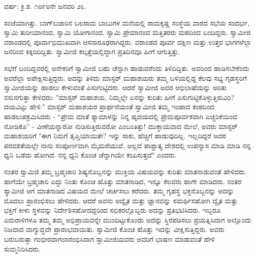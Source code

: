 \begin{center}
ವರ್ಷ: ಕ್ರಿ.ಶ. ೧೮೯೮ನೇ ಜನವರಿ ೨೩.
\end{center}

ಸಂಜೆಯಾಗಿತ್ತು. ಬಾಗ್‌ಬಜಾರಿನ ಬಲರಾಮ ಬಾಬುಗಳ ಮನೆಯಲ್ಲಿ ರಾಮಕೃಷ್ಣ ಸಂಸ್ಥೆಯ ವಾರದ ಸಭೆಯ ಸಂದರ್ಭ, ಸ್ವಾಮಿ ತುರೀಯಾನಂದ, ಸ್ವಾಮಿ ಯೋಗಾನಂದ, ಸ್ವಾಮಿ ಪ್ರೇಮಾನಂದ ಮತ್ತಿತರರು ಮಠದಿಂದ ಬಂದಿದ್ದರು. ಸ್ವಾಮೀಜಿ ವರಾಂಡದಲ್ಲಿ ಪೂರ್ವಾಭಿಮುಖವಾಗಿ ಆಸನಾರೂಢರಾಗಿದ್ದರು. ವರಾಂಡದ ಪೂರ್ವ ದಕ್ಷಿಣ ಮತ್ತು ಉತ್ತರ ಭಾಗಗಳೆಲ್ಲಾ ಜನರಿಂದ ಕಿಕ್ಕಿರಿದಿದ್ದಿತು. ಸ್ವಾಮೀಜಿ ಕಲ್ಕತ್ತೆಯಲ್ಲಿದ್ದಾಗ ಪ್ರತಿದಿನವೂ ಹೀಗೆ ಆಗುತ್ತಿತ್ತು.

ಸಭೆಗೆ ಬಂದಿದ್ದವರಲ್ಲಿ ಅನೇಕರಿಗೆ ಸ್ವಾಮೀಜಿ ಬಹು ಚೆನ್ನಾಗಿ ಹಾಡುವರೆಂದು ತಿಳಿದಿದ್ದಿತು. ಅವರಿಂದ ಹಾಡಿಸಬೇಕೆಂದು ಅವರೆಲ್ಲಾ ಅಪೇಕ್ಷಿಸುತ್ತಿದ್ದರು. ಅದನ್ನು ತಿಳಿದು ಮಾಸ್ಟರ್ ಮಹಾಶಯರು ತಮ್ಮ ಬಳಿಯಲ್ಲಿದ್ದ ಕೆಲವು ಸಭ್ಯ ಗೃಹಸ್ಥರಿಗೆ ಸ್ವಾಮೀಜಿಯನ್ನು ಹಾಡಲು ಕೇಳುವಂತೆ ಪಿಸುಗುಟ್ಟಿದರು. ಆದರೆ ಸ್ವಾಮೀಜಿ ಅವರ ಅಭಿಲಾಷೆಯನ್ನು ಅರಿತು ನಸುನಗುತ್ತಾ ಕೇಳಿದರು: "ಮಾಸ್ಟರ್ ಮಹಾಶಯ, ನಿಮ್ಮಲ್ಲೇ ಏನನ್ನು ಕುರಿತು ಹೀಗೆ ಪಿಸುಗುಟ್ಟಿಕೊಳ್ಳುತ್ತಿರುವಿರಿ? ದಯವಿಟ್ಟು ಹೇಳಿ." ಮಾಸ್ಟರ್ ಮಹಾಶಯರ ಪ್ರಾರ್ಥನೆಯಂತೆ ಸ್ವಾಮೀಜಿ ತಮ್ಮ ಇಂಪಾದ ಕಂಠದಿಂದ ಹಾಡಲುಪಕ್ರಮಿಸಿದರು - “ಪ್ರೇಮ ಮಾತೆ ಶ್ಯಾಮಾಳನ್ನು ನಿನ್ನ ಹೃದಯದಲ್ಲಿ ಪ್ರೇಮಪೂರ್ವಕವಾಗಿ ಎಚ್ಚರಿಕೆಯಿಂದ ನೋಡಿಕೊ” - ವೀಣೆಯನ್ನಾರೋ ನುಡಿಸುತ್ತಿರುವರೋ ಎಂಬಂತಿತ್ತು! ಮುಕ್ತಾಯವಾದ ಮೇಲೆ, ಅವರು ಮಾಸ್ಟರ್ ಮಹಾಶಯರಿಗೆ "ಈಗ ನಿಮಗೆ ತೃಪ್ತಿಯಾಯಿತೇ? ಇನ್ನು ಸಾಕು, ಹೆಚ್ಚಿಗೆ ಹಾಡುವುದಿಲ್ಲ. ಇಲ್ಲದಿದ್ದರೆ ಅದರ ಪರವಶತೆಯಲ್ಲೇ ನಾನು ಸಂಪೂರ್ಣವಾಗಿ ಮೈಮರೆಯುವೆ. ಅಲ್ಲದೆ ಪಾಶ್ಚಾತ್ಯ ದೇಶದಲ್ಲಿ ಉಪನ್ಯಾಸ ಮಾಡಿ ಮಾಡಿ ನನ್ನ ಧ್ವನಿ ಒಡೆದು ಹೋಗಿದೆ. ನನ್ನ ಧ್ವನಿ ಕೊಂಚ ಚೆನ್ನಾಗಿಯೇ ಕಂಪಿಸುತ್ತದೆ" ಎಂದರು.

ನಂತರ ಸ್ವಾಮಿಜಿ ತಮ್ಮ ಬ್ರಹ್ಮಚಾರಿ ಶಿಷ್ಯನೊಬ್ಬನನ್ನು ಮುಕ್ತಿಯ ವಿಷಯವನ್ನು ಕುರಿತು ಮಾತನಾಡುವಂತೆ ಹೇಳಿದರು. ಹಾಗೆಯೇ ಬ್ರಹ್ಮಚಾರಿ ಎದ್ದು ನಿಂತು ಕೊಂಚ ಹೊತ್ತು ಮಾತನಾಡಿದ, ಇನ್ನೂ ಕೆಲವರು ಹಾಗೇ ಮಾಡಿದರು. ನಂತರ ಸ್ಯಾಮೀಜಿ ಆಗ ಮಾತನಾಡಿದ ವಿಷಯದ ಮೇಲೆ ಚರ್ಚಿಸಲು ಕರೆದರು. ತಮ್ಮ ಗೃಹಸ್ಥ ಭಕ್ತನೊಬ್ಬನನ್ನು ಅದನ್ನು ಮೊದಲು ಪ್ರಾರಂಭಿಸಲು ಹೇಳಿದರು. ಆದರೆ ಅವನು ಅದ್ವೈತ ಮತ್ತು ಜ್ಞಾನವನ್ನು ಸಮರ್ಥಿಸಹೋಗಿ ದ್ವೈತ ಮತ್ತು ಭಕ್ತಿಗೆ ಕೀಳು ಸ್ಥಳವನ್ನು ನಿರ್ದೇಶಿಸಹೋದದ್ದರಿಂದ ಸಭಿಕರಲ್ಲೊಬ್ಬರು ಅದನ್ನು ಪ್ರತಿಭಟಿಸಿದರು. ಇಬ್ಬರೂ ಎದುರಾಳಿಗಳೂ ತಮ್ಮ ತಮ್ಮ ಅಭಿಪ್ರಾಯವನ್ನೇ ಮುಂದಿಟ್ಟುಕೊಂಡು ಅದನ್ನು ಸ್ಥಿರಪಡಿಸಲು ಪ್ರಯತ್ನಿಸಿದಾಗ ಅಲ್ಲೊಂದು ನಿಜವಾದ ವಾಗ್ಯುದ್ಧವೇ ಪ್ರಾರಂಭವಾಯಿತು. ಸ್ವಾಮೀಜಿ ಕೊಂಚ ಹೊತ್ತು ಇದನ್ನು ವೀಕ್ಷಿಸುತ್ತಿದ್ದರು. ಅವರು ಬರುಬರುತ್ತಾ ಗಂಭೀರವಾಗಲಾರಂಭಿಸಿದಾಗ ಸ್ವಾಮೀಜಿಯವರು ಅವರಿಗೆ ಭಾಷಣ ಮಾಡುವಂತೆ ಹೇಳಿ ಸುಮ್ಮನಿರಿಸಿದರು.

